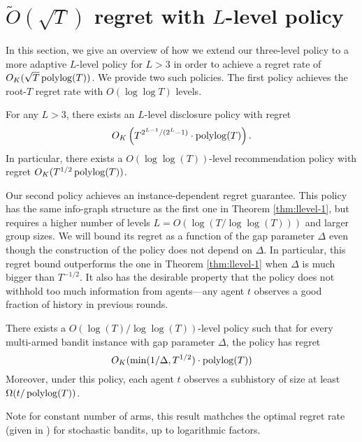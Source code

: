 
\section{$\tilde O(\sqrt{T})$ regret with $L$-level policy}
\label{sec:llevel}
In this section, we give an overview of how we extend our three-level
policy to a more adaptive $L$-level policy for $L > 3$ in order to
achieve a regret rate of $O_K(\sqrt{T} \polylog(T))$. We provide two
such policies. The first policy achieves the root-$T$ regret rate with
$O(\log \log T)$ levels.

\begin{theorem}
\label{thm:llevel-1}
For any $L > 3$, there exists an $L$-level disclosure policy with
regret $$O_K\left(T^{2^{L-1}/(2^L-1)} \cdot \polylog(T) \right).$$ In
particular, there exists a $O(\log\log(T))$-level recommendation
policy with regret $O_K(T^{1/2} \polylog(T))$.
\end{theorem}

Our second policy achieves an instance-dependent regret
guarantee. This policy has the same info-graph structure as the first
one in Theorem \ref{thm:llevel-1}, but requires a higher number of
levels $L = O(\log(T/\log\log(T)))$ and larger group sizes. We will
bound its regret as a function of the gap parameter $\Delta$ even
though the construction of the policy does not depend on $\Delta$. In
particular, this regret bound outperforms the one in Theorem
\ref{thm:llevel-1} when $\Delta$ is much bigger than $T^{-1/2}$.  It
also has the desirable property that the policy does not withhold too
much information from agents---any agent $t$ observes a good fraction
of history in previous rounds.

\begin{theorem}
\label{thm:llevel-2}
There exists a $O(\log(T)/\log\log(T))$-level policy such that for
every multi-armed bandit instance with gap parameter $\Delta$, the
policy has regret $$O_K(\min(1/\Delta, T^{1/2}) \cdot \polylog(T))$$
Moreover, under this policy, each agent $t$ observes a subhistory of
size at least $\Omega( t/\polylog(T))$.
\end{theorem}

Note for constant number of arms, this result mathches the optimal
regret rate (given in ) for stochastic
bandits, up to logarithmic factors.


